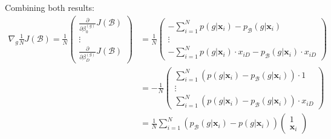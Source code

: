 \documentclass{article}
\begin{document}
Combining both results:
\begin{equation*}
    \begin{split}
        \nabla_{g} \frac{1}{N} J(\mathcal{B}) = \frac{1}{N} \begin{pmatrix}\frac{\partial}{\partial \beta_{0}^{(g)}} J(\mathcal{B}) \\ \vdots \\ \frac{\partial}{\partial \beta_{D}^{(g)}} J(\mathcal{B}) \end{pmatrix} & = \frac{1}{N} \begin{pmatrix} 
        - \sum_{i = 1}^{N} p(g | \boldsymbol x_{i}) - p_{\mathcal{B}}(g | \boldsymbol x_{i}) \\
        \vdots \\
        - \sum_{i = 1}^{N} p(g | \boldsymbol x_{i}) \cdot x_{iD} - p_{\mathcal{B}}(g | \boldsymbol x_{i}) \cdot x_{iD}
        \end{pmatrix} \\
        & = - \frac{1}{N} \begin{pmatrix} 
        \sum_{i = 1}^{N} (p(g | \boldsymbol x_{i}) - p_{\mathcal{B}}(g | \boldsymbol x_{i})) \cdot 1 \\
        \vdots \\
        \sum_{i = 1}^{N} (p(g | \boldsymbol x_{i}) - p_{\mathcal{B}}(g | \boldsymbol x_{i})) \cdot x_{iD}
        \end{pmatrix} \\
        & = \frac{1}{N} \sum_{i = 1}^{N} (p_{\mathcal{B}}(g | \boldsymbol x_{i}) - p(g | \boldsymbol x_{i})) \begin{pmatrix} 1 \\ \boldsymbol x_{i} \end{pmatrix}
    \end{split}
\end{equation*}
\end{document}
